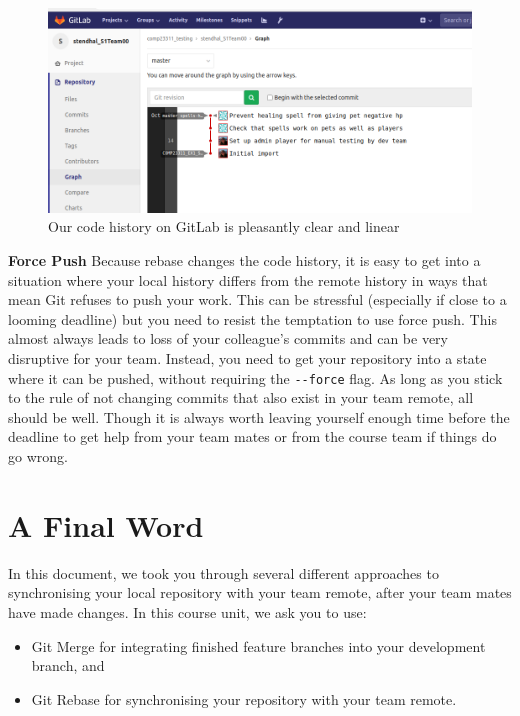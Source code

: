 \documentclass[
]{book}
\providecommand{\tightlist}{%
  \setlength{\itemsep}{0pt}\setlength{\parskip}{0pt}}
\begin{document}
\begin{figure}

{\centering \includegraphics[width=1\linewidth]{images/commitGraphInGitLabRebaseExampleAfterPushNoHistory} 

}

\caption{Our code history on GitLab is pleasantly clear and linear}\label{fig:commitGraphInGitLabRebaseExampleAfterPushNoHistory-fig}
\end{figure}

\textbf{Force Push}
Because rebase changes the code history, it is easy to get into a situation where your local history differs from the remote history in ways that mean Git refuses to push your work. This can be stressful (especially if close to a looming deadline) but you need to resist the temptation to use force push. This almost always leads to loss of your colleague's commits and can be very disruptive for your team.
Instead, you need to get your repository into a state where it can be pushed, without requiring the \texttt{-\/-force} flag. As long as you stick to the rule of not changing commits that also exist in your team remote, all should be well. Though it is always worth leaving yourself enough time before the deadline to get help from your team mates or from the course team if things do go wrong.

\hypertarget{rFinalWord}{%
\section{A Final Word}\label{rFinalWord}}

In this document, we took you through several different approaches to synchronising your local repository with your team remote, after your team mates have made changes. In this course unit, we ask you to use:

\begin{itemize}
\tightlist
\item
  Git Merge for integrating finished feature branches into your development branch, and
\item
  Git Rebase for synchronising your repository with your team remote.
\end{itemize}
\end{document}
